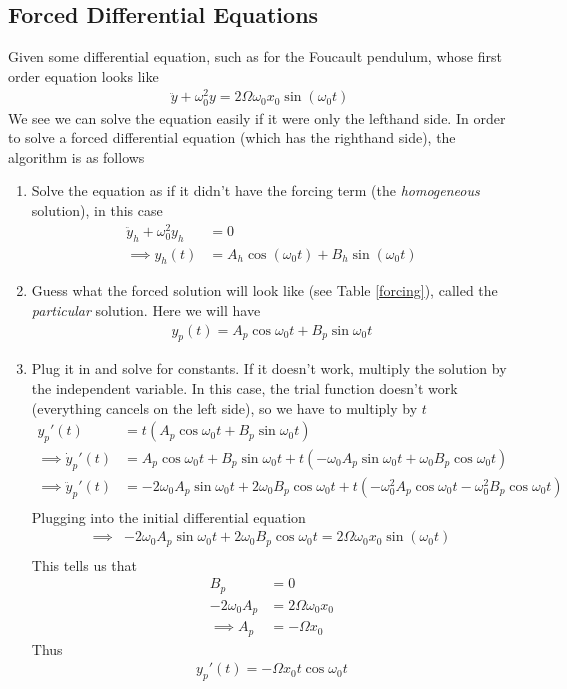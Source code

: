 \subsection{Forced Differential Equations}
Given some differential equation, such as for the Foucault pendulum\cite{taylor}, whose first order equation looks like
\begin{align}
\ddot{y} + \omega_0^2y = 2\Omega\omega_0 x_0\sin(\omega_0 t)
\end{align}
We see we can solve the equation easily if it were only the lefthand side. In order to solve a forced differential equation (which has the righthand side), the algorithm is as follows
\begin{enumerate}
\item Solve the equation as if it didn't have the forcing term (the \emph{homogeneous} solution), in this case
\begin{align}
\ddot{y}_h + \omega_0^2y_h &= 0\\
\implies y_h(t) &= A_h\cos(\omega_0 t) + B_h\sin(\omega_0 t)
\end{align}
\item Guess what the forced solution will look like (see Table \ref{forcing}), called the \emph{particular} solution. Here we will have
\begin{align}
y_p(t) = A_p\cos\omega_0 t + B_p\sin\omega_0 t
\end{align}
\item Plug it in and solve for constants. If it doesn't work, multiply the solution by the independent variable. In this case, the trial function doesn't work (everything cancels on the left side), so we have to multiply by $t$
\begin{align}
y_p'(t) &= t(A_p\cos\omega_0 t + B_p\sin\omega_0 t)\\
\implies \dot{y}_p'(t) &= A_p\cos\omega_0 t + B_p\sin\omega_0 t + t(-\omega_0A_p\sin\omega_0 t + \omega_0B_p\cos\omega_0 t)\\
\implies \ddot{y}_p'(t) &= -2\omega_0A_p\sin\omega_0 t + 2\omega_0B_p\cos\omega_0 t +t(-\omega_0^2 A_p\cos\omega_0t -\omega_0^2B_p\cos\omega_0 t)\\
\end{align}
Plugging into the initial differential equation
\begin{align}
\implies & -2\omega_0A_p\sin\omega_0 t + 2\omega_0B_p\cos\omega_0 t = 2\Omega\omega_0 x_0\sin(\omega_0 t)\\
\end{align}
This tells us that
\begin{align}
B_p &= 0\\
-2\omega_0A_p &= 2\Omega \omega_0x_0\\
\implies A_p &= -\Omega x_0
\end{align}
Thus
\begin{align}
y_p'(t) = -\Omega x_0 t\cos\omega_0 t
\end{align}


\end{enumerate}
